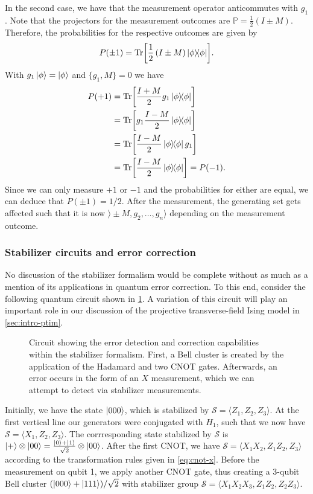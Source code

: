 In the second case, we have that the measurement operator anticommutes with
$g_1$. Note that the projectors for the measurement outcomes are $\mathbb{P} =
\frac{1}{2}\left( I\pm M \right)$. Therefore, the probabilities for the
respective outcomes are given by
\begin{align}
  P(\pm 1) = \Tr[\frac{1}{2}\left( I\pm M \right) \dyad{\phi}]
.\end{align}
With $g_1 \ket{\phi} = \ket{\phi}$ and $\{g_1, M\} =0$ we have
\begin{align}
  P(+1) &= \Tr[\frac{I+M}{2} g_1 \dyad{\phi}] \nonumber\\
        &= \Tr[g_1 \frac{I-M}{2} \dyad{\phi}] \nonumber\\
        &= \Tr[\frac{I-M}{2} \dyad{\phi} g_1] \nonumber\\
        &= \Tr[\frac{I-M}{2} \dyad{\phi}] = P(-1)
.\end{align}
Since we can only measure $+1$ or $-1$ and the probabilities for either are
equal, we can deduce that $P(\pm 1) = 1 / 2$. After the measurement, the
generating set gets affected such that it is now
$\rangle \pm M, g_2, \ldots, g_n\rangle$ depending on the measurement outcome.

\subsubsection{Stabilizer circuits and error correction}

No discussion of the stabilizer formalism would be complete without as much as
a mention of its applications in quantum error correction. To this end,
consider the following quantum circuit shown in
\cref{fig:error-detection-circuit}. A variation of this circuit will play
an important role in our discussion of the projective transverse-field Ising
model in \cref{sec:intro-ptim}.

\begin{figure}[H]
  \centering
  
  \caption{Circuit showing the error detection and correction capabilities
    within the stabilizer formalism.  First, a Bell cluster is created by the
    application of the Hadamard and two CNOT gates.  Afterwards, an error
    occurs in the form of an $X$ measurement, which we can attempt to detect
    via stabilizer measurements.}
  \label{fig:error-detection-circuit}
\end{figure}

Initially, we have the state $\ket{000}$, which is stabilized by $\mathcal{S} =
\langle Z_1, Z_2, Z_3 \rangle$. At the first vertical line our generators were
conjugated with $H_1$, such that we now have $\mathcal{S} = \langle X_1, Z_2,
Z_3 \rangle$. The corrresponding state stabilized by $\mathcal{S}$ is
$\ket{+}\otimes\ket{00}=\frac{\ket{0}+\ket{1}}{\sqrt{2}} \otimes \ket{00}$.
After the first CNOT, we have $\mathcal{S} = \langle X_1X_2,Z_1Z_2,Z_3\rangle$
according to the transformation rules given in \cref{eq:cnot-x}. Before the measurement on qubit 1, we
apply another CNOT gate, thus creating a 3-qubit Bell cluster
$(\ket{000}+\ket{111}) / \sqrt{2}$ with stabilizer group $\mathcal{S}= \langle
X_1X_2X_3,Z_1Z_2,Z_2Z_3\rangle$. 

